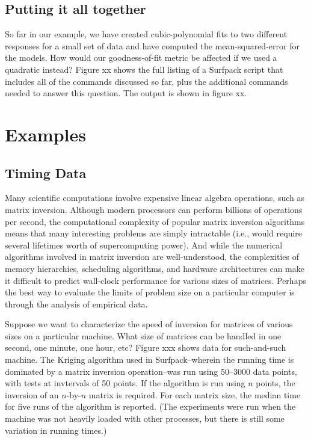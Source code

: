 \documentclass{article}
\begin{document}
\subsection{Putting it all together}
So far in our example, we have created cubic-polynomial fits to two different responses for a small set of data and have computed the mean-squared-error for the models.  How would our goodness-of-fit metric be affected if we used a quadratic instead?  Figure xx shows the full listing of a Surfpack script that includes all of the commands discussed so far, plus the additional commands needed to answer this question. The output is shown in figure xx.


\section{Examples}
\subsection{Timing Data}
Many scientific computations involve expensive linear algebra operations, such as matrix inversion.  Although modern processors can perform billions of operations per second, the computational complexity of popular matrix inversion algorithms means that many interesting problems are simply intractable (i.e., would require several lifetimes worth of supercomputing power).  And while the numerical algorithms involved in matrix inversion are well-understood, the complexities of memory hierarchies, scheduling algorithms, and hardware architectures can make it difficult to predict wall-clock performance for various sizes of matrices.  Perhaps the best way to evaluate the limits of problem size on a particular computer is through the analysis of empirical data.

Suppose we want to characterize the speed of inversion for matrices of various sizes on a particular machine.  What size of matrices can be handled in one second, one minute, one hour, etc?  Figure xxx shows data for such-and-such machine.  The Kriging algorithm used in Surfpack--wherein the running time is dominated by a matrix inversion operation--was run using 50--3000 data points, with tests at invtervals of 50 points.  If the algorithm is run using $n$ points, the inversion of an $n$-by-$n$ matrix is required.  For each matrix size, the median time for five runs of the algorithm is reported.  (The experiments were run when the machine was not heavily loaded with other processes, but there is still some variation in running times.)
\end{document}
